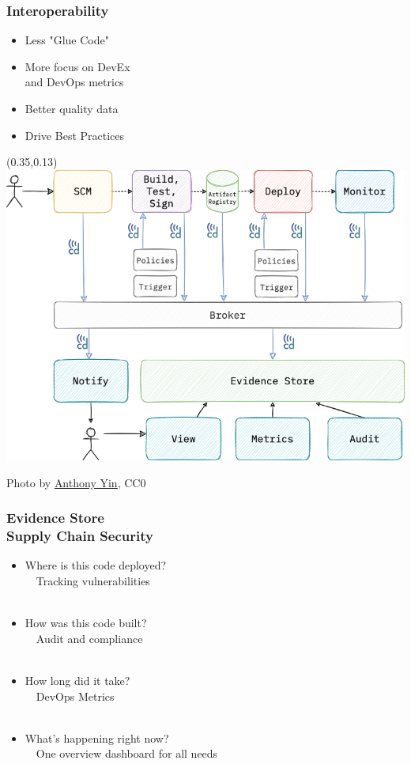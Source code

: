 \documentclass[aspectratio=169,11pt,hyperref={colorlinks=true}]{beamer}
\begin{document}
\begin{grayframe}
  \frametitle{Interoperability}
  \begin{itemize}
    \item Less "Glue Code"
    \item More focus on DevEx \\
          and DevOps metrics
    \item Better quality data
    \item Drive Best Practices
  \end{itemize}
  \begin{textblock*}{0.60\paperwidth}(0.35\paperwidth,0.13\paperheight)
    \includegraphics[width=0.60\paperwidth]{img/cdevents-4-Interoperability.png}
  \end{textblock*}
\end{grayframe}

\begin{textondarkpic}{%
  Photo by \href{https://unsplash.com/@anthonyin}{\underline{Anthony Yin}}, CC0
  }%
  \frametitle{Evidence Store\\Supply Chain Security}
  \begin{itemize}
    \item Where is this code deployed?\\
          ~~Tracking vulnerabilities\\~
    \item How was this code built?\\
          ~~Audit and compliance\\~
    \item How long did it take?\\
          ~~DevOps Metrics\\~
    \item What's happening right now?\\
          ~~One overview dashboard for all needs
  \end{itemize}
\end{textondarkpic}
\end{document}
